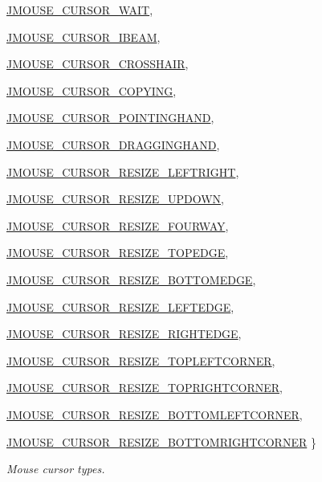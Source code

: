 \begin{DoxyCompactItemize}
\hyperlink{group__jmouse_gga4d6e7dd3d4d260c28f3bce9b9f36f764ac17292952b3917c5589840be71d7ce59}{JMOUSE\_\-CURSOR\_\-WAIT}, 
\par
\hyperlink{group__jmouse_gga4d6e7dd3d4d260c28f3bce9b9f36f764ac05d3d2e1d07b631a46539736686d4c3}{JMOUSE\_\-CURSOR\_\-IBEAM}, 
\par
\hyperlink{group__jmouse_gga4d6e7dd3d4d260c28f3bce9b9f36f764a35a12bc385a80316bc6896d1516a4fdb}{JMOUSE\_\-CURSOR\_\-CROSSHAIR}, 
\par
\hyperlink{group__jmouse_gga4d6e7dd3d4d260c28f3bce9b9f36f764a7250b137e39249c7bb6c1c6eb8922c1f}{JMOUSE\_\-CURSOR\_\-COPYING}, 
\par
\hyperlink{group__jmouse_gga4d6e7dd3d4d260c28f3bce9b9f36f764abccdb4469e6489b6a5dfaaf22ce8ba72}{JMOUSE\_\-CURSOR\_\-POINTINGHAND}, 
\par
\hyperlink{group__jmouse_gga4d6e7dd3d4d260c28f3bce9b9f36f764a774be99ae9208193fcc12e9892c5fb13}{JMOUSE\_\-CURSOR\_\-DRAGGINGHAND}, 
\par
\hyperlink{group__jmouse_gga4d6e7dd3d4d260c28f3bce9b9f36f764ab15152ccd94c5d58bd39762623936c0f}{JMOUSE\_\-CURSOR\_\-RESIZE\_\-LEFTRIGHT}, 
\par
\hyperlink{group__jmouse_gga4d6e7dd3d4d260c28f3bce9b9f36f764a52c6ff88129c46cd0185ed62e25d79c9}{JMOUSE\_\-CURSOR\_\-RESIZE\_\-UPDOWN}, 
\par
\hyperlink{group__jmouse_gga4d6e7dd3d4d260c28f3bce9b9f36f764a7d196b58e9ad2fedd1364f18241538bd}{JMOUSE\_\-CURSOR\_\-RESIZE\_\-FOURWAY}, 
\par
\hyperlink{group__jmouse_gga4d6e7dd3d4d260c28f3bce9b9f36f764adfebe355c0d326a5b00eccef325b26e8}{JMOUSE\_\-CURSOR\_\-RESIZE\_\-TOPEDGE}, 
\par
\hyperlink{group__jmouse_gga4d6e7dd3d4d260c28f3bce9b9f36f764a1cb50c2c1de7463dfee84c76b4d97033}{JMOUSE\_\-CURSOR\_\-RESIZE\_\-BOTTOMEDGE}, 
\par
\hyperlink{group__jmouse_gga4d6e7dd3d4d260c28f3bce9b9f36f764a4ab4bb1b2fc5ec983bd7cf47caaca6d0}{JMOUSE\_\-CURSOR\_\-RESIZE\_\-LEFTEDGE}, 
\par
\hyperlink{group__jmouse_gga4d6e7dd3d4d260c28f3bce9b9f36f764afea1f12d5ea482fe2c1975a73e814f70}{JMOUSE\_\-CURSOR\_\-RESIZE\_\-RIGHTEDGE}, 
\par
\hyperlink{group__jmouse_gga4d6e7dd3d4d260c28f3bce9b9f36f764a12bb9da9116a40054c05181106ccc41d}{JMOUSE\_\-CURSOR\_\-RESIZE\_\-TOPLEFTCORNER}, 
\par
\hyperlink{group__jmouse_gga4d6e7dd3d4d260c28f3bce9b9f36f764a1ae8f97d47638054cc83f62a30dc8a69}{JMOUSE\_\-CURSOR\_\-RESIZE\_\-TOPRIGHTCORNER}, 
\par
\hyperlink{group__jmouse_gga4d6e7dd3d4d260c28f3bce9b9f36f764a2f3381b1c55f90dea6758fb5c5329183}{JMOUSE\_\-CURSOR\_\-RESIZE\_\-BOTTOMLEFTCORNER}, 
\par
\hyperlink{group__jmouse_gga4d6e7dd3d4d260c28f3bce9b9f36f764a4d2d8c6debf92b7113cca58446b9fb65}{JMOUSE\_\-CURSOR\_\-RESIZE\_\-BOTTOMRIGHTCORNER}
 \}
\begin{DoxyCompactList}\small\item\em Mouse cursor types. \item\end{DoxyCompactList}\end{DoxyCompactItemize}
